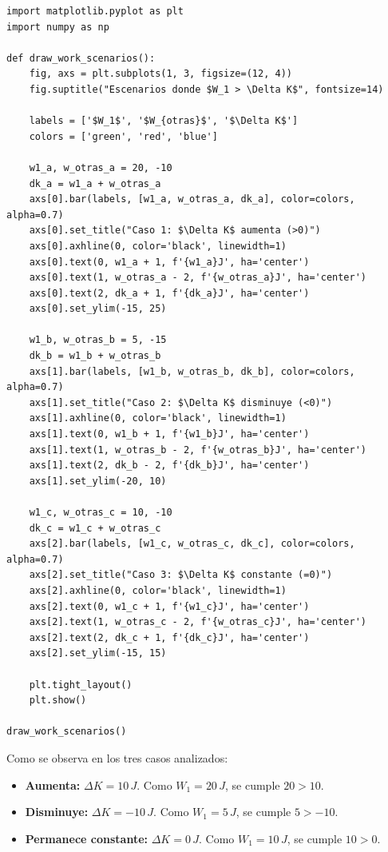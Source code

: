 \documentclass[12pt, a4paper]{article}
\begin{document}
\begin{lstlisting}
import matplotlib.pyplot as plt
import numpy as np

def draw_work_scenarios():
    fig, axs = plt.subplots(1, 3, figsize=(12, 4))
    fig.suptitle("Escenarios donde $W_1 > \Delta K$", fontsize=14)

    labels = ['$W_1$', '$W_{otras}$', '$\Delta K$']
    colors = ['green', 'red', 'blue']

    w1_a, w_otras_a = 20, -10
    dk_a = w1_a + w_otras_a
    axs[0].bar(labels, [w1_a, w_otras_a, dk_a], color=colors, alpha=0.7)
    axs[0].set_title("Caso 1: $\Delta K$ aumenta (>0)")
    axs[0].axhline(0, color='black', linewidth=1)
    axs[0].text(0, w1_a + 1, f'{w1_a}J', ha='center')
    axs[0].text(1, w_otras_a - 2, f'{w_otras_a}J', ha='center')
    axs[0].text(2, dk_a + 1, f'{dk_a}J', ha='center')
    axs[0].set_ylim(-15, 25)

    w1_b, w_otras_b = 5, -15
    dk_b = w1_b + w_otras_b
    axs[1].bar(labels, [w1_b, w_otras_b, dk_b], color=colors, alpha=0.7)
    axs[1].set_title("Caso 2: $\Delta K$ disminuye (<0)")
    axs[1].axhline(0, color='black', linewidth=1)
    axs[1].text(0, w1_b + 1, f'{w1_b}J', ha='center')
    axs[1].text(1, w_otras_b - 2, f'{w_otras_b}J', ha='center')
    axs[1].text(2, dk_b - 2, f'{dk_b}J', ha='center')
    axs[1].set_ylim(-20, 10)

    w1_c, w_otras_c = 10, -10
    dk_c = w1_c + w_otras_c
    axs[2].bar(labels, [w1_c, w_otras_c, dk_c], color=colors, alpha=0.7)
    axs[2].set_title("Caso 3: $\Delta K$ constante (=0)")
    axs[2].axhline(0, color='black', linewidth=1)
    axs[2].text(0, w1_c + 1, f'{w1_c}J', ha='center')
    axs[2].text(1, w_otras_c - 2, f'{w_otras_c}J', ha='center')
    axs[2].text(2, dk_c + 1, f'{dk_c}J', ha='center')
    axs[2].set_ylim(-15, 15)

    plt.tight_layout()
    plt.show()

draw_work_scenarios()
\end{lstlisting}

Como se observa en los tres casos analizados:
\begin{itemize}
    \item \textbf{Aumenta:} $\Delta K = 10 \, \si{J}$. Como $W_1 = 20 \, \si{J}$, se cumple $20 > 10$.
    \item \textbf{Disminuye:} $\Delta K = -10 \, \si{J}$. Como $W_1 = 5 \, \si{J}$, se cumple $5 > -10$.
    \item \textbf{Permanece constante:} $\Delta K = 0 \, \si{J}$. Como $W_1 = 10 \, \si{J}$, se cumple $10 > 0$.
\end{itemize}
\end{document}
